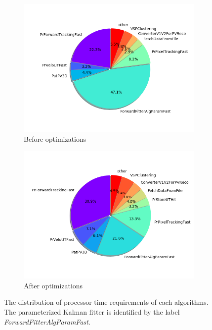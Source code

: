 \documentclass[12pt]{article}
\begin{document}
\begin{figure}[H]
	\centering
	\begin{subfigure}{.5\textwidth}
		\centering
		\includegraphics[width=\linewidth]{algo_usage_original_bestphys}
		\caption{Before optimizations}
	\end{subfigure}%
	\begin{subfigure}{.5\textwidth}
		\centering
		\includegraphics[width=\linewidth]{algo_usage_optkalman_bestphys}
		\caption{After optimizations}
	\end{subfigure}
	\caption{The distribution of processor time requirements of each algorithms. The parameterized Kalman fitter is identified by the label \textit{ForwardFitterAlgParamFast}.}
	\label{fig_kalmanfit_results_algousage}
\end{figure}
\end{document}
